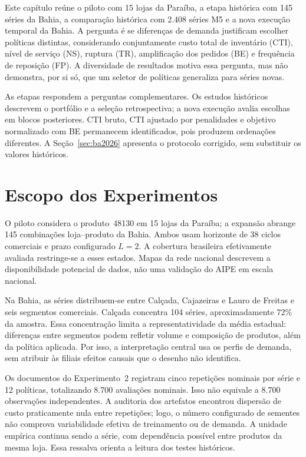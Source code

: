 
Este capítulo reúne o piloto com 15 lojas da Paraíba, a etapa histórica com 145 séries da Bahia, a comparação histórica com 2.408 séries M5 e a nova execução temporal da Bahia. A pergunta é se diferenças de demanda justificam escolher políticas distintas, considerando conjuntamente custo total de inventário (CTI), nível de serviço (NS), ruptura (TR), amplificação dos pedidos (BE) e frequência de reposição (FP). A diversidade de resultados motiva essa pergunta, mas não demonstra, por si só, que um seletor de políticas generaliza para séries novas.

As etapas respondem a perguntas complementares. Os estudos históricos descrevem o portfólio e a seleção retrospectiva; a nova execução avalia escolhas em blocos posteriores. CTI bruto, CTI ajustado por penalidades e objetivo normalizado com BE permanecem identificados, pois produzem ordenações diferentes. A Seção~\ref{sec:ba2026} apresenta o protocolo corrigido, sem substituir os valores históricos.

\section{Escopo dos Experimentos}

O piloto considera o produto~48130 em 15 lojas da Paraíba; a expansão abrange 145 combinações loja--produto da Bahia. Ambos usam horizonte de 38 ciclos comerciais e prazo configurado $L=2$. A cobertura brasileira efetivamente avaliada restringe-se a esses estados. Mapas da rede nacional descrevem a disponibilidade potencial de dados, não uma validação do AIPE em escala nacional.

Na Bahia, as séries distribuem-se entre Calçada, Cajazeiras e Lauro de Freitas e seis segmentos comerciais. Calçada concentra 104 séries, aproximadamente 72\% da amostra. Essa concentração limita a representatividade da média estadual: diferenças entre segmentos podem refletir volume e composição de produtos, além da política aplicada. Por isso, a interpretação central usa os perfis de demanda, sem atribuir às filiais efeitos causais que o desenho não identifica.

Os documentos do Experimento~2 registram cinco repetições nominais por série e 12 políticas, totalizando 8.700 avaliações nominais. Isso não equivale a 8.700 observações independentes. A auditoria dos artefatos encontrou dispersão de custo praticamente nula entre repetições; logo, o número configurado de sementes não comprova variabilidade efetiva de treinamento ou de demanda. A unidade empírica continua sendo a série, com dependência possível entre produtos da mesma loja. Essa ressalva orienta a leitura dos testes históricos.

